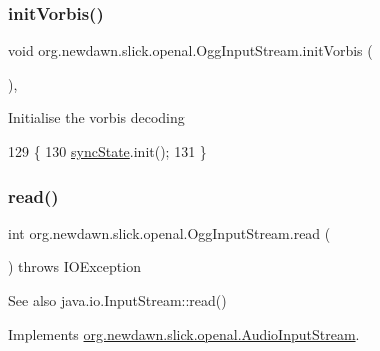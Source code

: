 \subsubsection{\texorpdfstring{init\+Vorbis()}{initVorbis()}}
{\footnotesize\ttfamily void org.\+newdawn.\+slick.\+openal.\+Ogg\+Input\+Stream.\+init\+Vorbis (\begin{DoxyParamCaption}{ }\end{DoxyParamCaption})\hspace{0.3cm}{\ttfamily [inline]}, {\ttfamily [private]}}

Initialise the vorbis decoding 
\begin{DoxyCode}
129                               \{
130         \mbox{\hyperlink{classorg_1_1newdawn_1_1slick_1_1openal_1_1_ogg_input_stream_a6cf0c439e1258dd57e8e83b52b76aefd}{syncState}}.init();
131     \}
\end{DoxyCode}
\mbox{\label{classorg_1_1newdawn_1_1slick_1_1openal_1_1_ogg_input_stream_a66397cab8bce3c41ce7bcb4447a66a46}} 
\subsubsection{\texorpdfstring{read()}{read()}\hspace{0.1cm}{\footnotesize\ttfamily [1/3]}}
{\footnotesize\ttfamily int org.\+newdawn.\+slick.\+openal.\+Ogg\+Input\+Stream.\+read (\begin{DoxyParamCaption}{ }\end{DoxyParamCaption}) throws I\+O\+Exception\hspace{0.3cm}{\ttfamily [inline]}}

\begin{DoxySeeAlso}{See also}
java.\+io.\+Input\+Stream\+::read() 
\end{DoxySeeAlso}


Implements \mbox{\hyperlink{interfaceorg_1_1newdawn_1_1slick_1_1openal_1_1_audio_input_stream_a4e9ee99faa0551bca581a985e262d619}{org.\+newdawn.\+slick.\+openal.\+Audio\+Input\+Stream}}.


